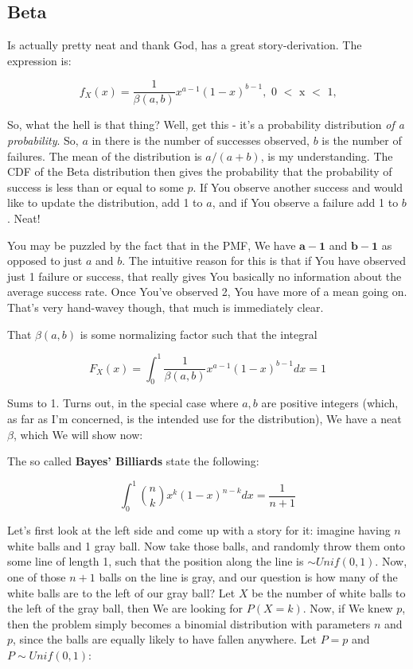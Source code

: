 \documentclass{article}
\begin{document}
	\subsection{Beta}
	
		Is actually pretty neat and thank God, has a great story-derivation\cite{Beta}. The expression is:
		
		\[ f_X(x) = \frac{1}{\beta(a, b)}x^{a-1}(1-x)^{b-1}, \text{ 0 $<$ x $<$ 1,} \]
		
		So, what the hell is that thing? Well, get this - it's a probability distribution \textit{of a probability}. So, $a$ in there is the number of successes observed, $b$ is the number of failures. The mean of the distribution is $a/(a+b)$, is my understanding. The CDF of the Beta distribution then gives the probability that the probability of success is less than or equal to some $p$. If You observe another success and would like to update the distribution, add 1 to $a$, and if You observe a failure add 1 to $b$. Neat!
		
		You may be puzzled by the fact that in the PMF, We have $\bm{a-1}$ and $\bm{b-1}$ as opposed to just $a$ and $b$. The intuitive reason for this is that if You have observed just 1 failure or success, that really gives You basically no information about the average success rate. Once You've observed 2, You have more of a mean going on. That's very hand-wavey though, that much is immediately clear.
		
		That $\beta(a, b)$ is some normalizing factor such that the integral
		
		\[ F_X(x) = \int^1_0 \frac{1}{\beta(a, b)}x^{a-1}(1-x)^{b-1}dx = 1\]
		
		Sums to 1. Turns out, in the special case where $a, b$ are positive integers (which, as far as I'm concerned, is the intended use for the distribution), We have a neat $\beta$, which We will show now:
		
		The so called \textbf{Bayes' Billiards} state the following:
		
		\[ \int^1_0 {n\choose k}x^k(1-x)^{n-k}dx = \frac{1}{n+1} \]
		
		Let's first look at the left side and come up with a story for it: imagine having $n$ white balls and 1 gray ball. Now take those balls, and randomly throw  them onto some line of length 1, such that the position along the line is $\sim Unif(0, 1)$. Now, one of those $n+1$ balls on the line is gray, and our question is how many of the white balls are to the left of our gray ball? Let $X$ be the number of white balls to the left of the gray ball, then We are looking for $P(X=k)$. Now, if We knew $p$, then the problem simply becomes a binomial distribution with parameters $n$ and $p$, since the balls are equally likely to have fallen anywhere. Let $P=p$ and $P\sim Unif(0, 1)$:
		
\end{document}
